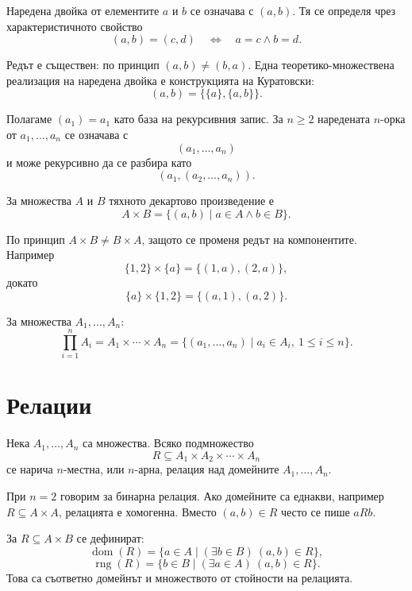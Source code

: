 \begin{keydefn}
Наредена двойка от елементите $a$ и $b$ се означава с $(a,b)$. Тя се определя чрез характеристичното свойство
\[
(a,b)=(c,d)\quad\Longleftrightarrow\quad a=c\land b=d.
\]
\end{keydefn}

Редът е съществен: по принцип $(a,b)\neq(b,a)$. Една теоретико-множествена реализация на наредена двойка е конструкцията на Куратовски:
\[
(a,b)=\bigl\{\{a\},\{a,b\}\bigr\}.
\]

\begin{keydefn}
Полагаме $(a_1)=a_1$ като база на рекурсивния запис. За $n\geq 2$ наредената $n$-орка от $a_1,\ldots,a_n$ се означава с
\[
(a_1,\ldots,a_n)
\]
и може рекурсивно да се разбира като
\[
(a_1,(a_2,\ldots,a_n)).
\]
\end{keydefn}

\begin{keydefn}
За множества $A$ и $B$ тяхното декартово произведение е
\[
A\times B=\{(a,b)\mid a\in A\land b\in B\}.
\]
\end{keydefn}

По принцип $A\times B\neq B\times A$, защото се променя редът на компонентите. Например
\[
\{1,2\}\times\{a\}=\{(1,a),(2,a)\},
\]
докато
\[
\{a\}\times\{1,2\}=\{(a,1),(a,2)\}.
\]

\begin{keydefn}
За множества $A_1,\ldots,A_n$:
\[
\prod_{i=1}^{n}A_i
=
A_1\times\cdots\times A_n
=
\{(a_1,\ldots,a_n)\mid a_i\in A_i,\ 1\leq i\leq n\}.
\]
\end{keydefn}

\section{Релации}\label{s:1.5}

\begin{keydefn}
Нека $A_1,\ldots,A_n$ са множества. Всяко подмножество
\[
R\subseteq A_1\times A_2\times\cdots\times A_n
\]
се нарича $n$-местна, или $n$-арна, релация над домейните $A_1,\ldots,A_n$.
\end{keydefn}

При $n=2$ говорим за бинарна релация. Ако домейните са еднакви, например $R\subseteq A\times A$, релацията е хомогенна. Вместо $(a,b)\in R$ често се пише $aRb$.

\begin{defn}
За $R\subseteq A\times B$ се дефинират:
\[
\operatorname{dom}(R)=
\{a\in A\mid(\exists b\in B)\ (a,b)\in R\},
\]
\[
\operatorname{rng}(R)=
\{b\in B\mid(\exists a\in A)\ (a,b)\in R\}.
\]
Това са съответно домейнът и множеството от стойности на релацията.
\end{defn}

